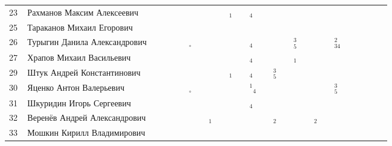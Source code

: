 \documentclass[a4paper,11pt]{article}
\newcommand*\Ok{&\small \ding{51}$\!\!_\circ$} %
\newcommand*\ok{&{\small \ding{51}}} %
\newcommand*\no{&{\small }} %
\newcommand*\da{&{\small\ding{48}$\!\!_1$}} %
\newcommand*\ad{&{\small${}^1\!\!$\ding{48}$\!\!_4$}} %
\newcommand*\db{&{\small\ding{48}$\!\!_2$}} %
\newcommand*\dd{&{\small\ding{48}$\!\!_4$}} %
\newcommand*\bd{&{\small\ding{48}$\!\!^2_{34}$}} %
\newcommand*\ce{&{\small\ding{48}$\!\!^3_5$}} %
\begin{document}
\begin{tabular}{p{7pt}|l|p{6pt}p{6pt}p{6pt}p{6pt}p{6pt}p{6pt}p{6pt}p{6pt}p{6pt}p{6pt}p{6pt}p{6pt}p{6pt}p{6pt}p{6pt}p{6pt}p{6pt}p{6pt}p{6pt}p{6pt}p{6pt}p{6pt}p{6pt}p{6pt}}
23\,&Рахманов Максим Алексеевич		\ok\ok\ok\ok\ok\ok\ok\ok\da\ok\dd\ok\ok\ok\ok\ok\no\ok\ok\\
25\,&Тараканов Михаил Егорович		\ok\ok\ok\ok\ok\ok\no\ok\ok\ok\ok\no\no\ok\ok\ok\no\ok\ok\\
26\,&Турыгин Данила Александрович	\ok\ok\ok\ok\Ok\ok\ok\ok\ok\ok\dd\ok\ok\ok\ce\ok\ok\ok\bd\\
27\,&Храпов Михаил Васильевич		\ok\ok\ok\ok\no\no\ok\ok\ok\ok\dd\ok\ok\ok\da\ok\ok\no\ok\\
\midrule
29\,&Штук Андрей Константинович		\ok\ok\ok\ok\ok\ok\no\ok\da\ok\dd\ok\ce\ok\ok\ok\ok\ok\ok\\
30\,&Яценко Антон Валерьевич		\ok\ok\ok\ok\Ok\no\ok\no\ok\ok\ad\no\no\no\ok\ok\ok\ok\ce\\
31\,&Шкуридин Игорь Сергеевич		\ok\no\ok\ok\ok\ok\ok\ok\no\ok\dd\no\no\no\ok\ok\no\ok\ok\\
32\,&Веренёв Андрей Александрович	\ok\ok\ok\ok\ok\ok\da\no\ok\ok\ok\ok\db\ok\ok\ok\db\ok\ok\\
33\,&Мошкин Кирилл Владимирович		\ok\ok\ok\ok\ok\ok\no\ok\ok\ok\\
\bottomrule
\end{tabular} 
\end{document}
